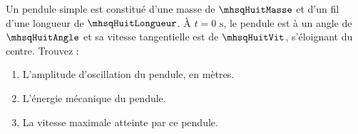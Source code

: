 Un pendule simple est constitué d’une masse de $\mhsqHuitMasse$ et d’un fil d’une longueur de $\mhsqHuitLongueur$. À $t = 0\text{ s}$, le pendule est à un angle de $\mhsqHuitAngle$ et sa vitesse tangentielle est de $\mhsqHuitVit$, s’éloignant du centre. Trouvez :

\begin{enumerate}[label=\alph*)]
    \item L’amplitude d’oscillation du pendule, en mètres.
    \item L’énergie mécanique du pendule.
    \item La vitesse maximale atteinte par ce pendule.
\end{enumerate}
